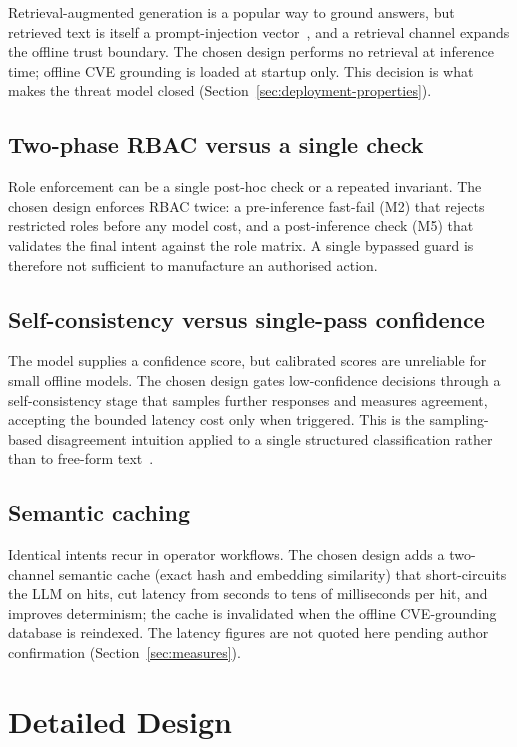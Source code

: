 Retrieval-augmented generation is a popular way to ground answers, but
retrieved text is itself a prompt-injection vector~\cite{greshake2023indirect},
and a retrieval channel expands the offline trust boundary. The chosen design
performs no retrieval at inference time; offline CVE grounding is loaded at
startup only. This decision is what makes the threat model closed
(Section~\ref{sec:deployment-properties}).

\subsection*{Two-phase RBAC versus a single check}

Role enforcement can be a single post-hoc check or a repeated invariant. The
chosen design enforces RBAC twice: a pre-inference fast-fail (M2) that rejects
restricted roles before any model cost, and a post-inference check (M5) that
validates the final intent against the role matrix. A single bypassed guard is
therefore not sufficient to manufacture an authorised action.

\subsection*{Self-consistency versus single-pass confidence}

The model supplies a confidence score, but calibrated scores are unreliable for
small offline models. The chosen design gates low-confidence decisions through
a self-consistency stage that samples further responses and measures agreement,
accepting the bounded latency cost only when triggered. This is the
sampling-based disagreement intuition applied to a single structured
classification rather than to free-form text~\cite{wang2023selfconsistency}.

\subsection*{Semantic caching}

Identical intents recur in operator workflows. The chosen design adds a
two-channel semantic cache (exact hash and embedding similarity) that
short-circuits the LLM on hits, cut latency from seconds to tens of
milliseconds per hit, and improves determinism; the cache is invalidated when
the offline CVE-grounding database is reindexed. The latency figures are not
quoted here pending author confirmation (Section~\ref{sec:measures}).


\section{Detailed Design}\label{sec:detailed-design}

